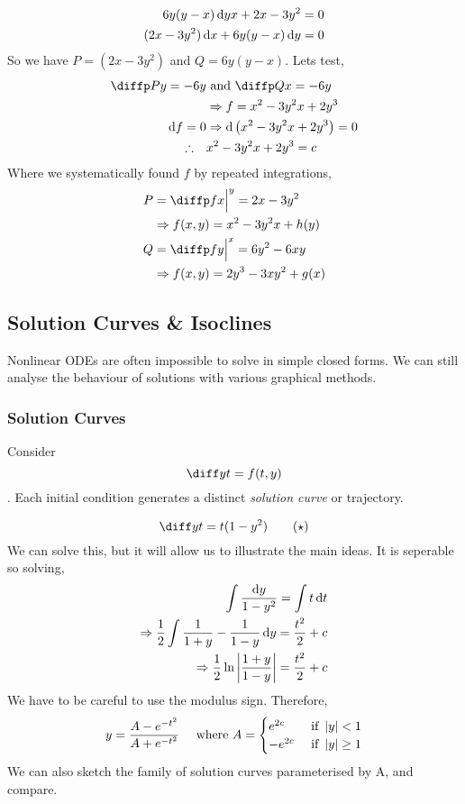 \documentclass{article}
\begin{document}
\begin{eg}
    \begin{align*}
        6y(y - x) \mathop{}\!\mathrm{d} yx + 2x - 3y^2 = 0 \\
        (2x - 3y^2) \mathop{}\!\mathrm{d} x + 6y(y-x) \mathop{}\!\mathrm{d} y = 0
    \end{align*}
    So we have $P = (2x - 3y^2)$ and $Q = 6y(y-x)$. Lets test,
    \begin{align*}
        \diffp Py = -6y &\text{ and } \diffp Qx = -6y \\
        &\Rightarrow f = x^2 - 3y^2x + 2y^3 \\
        \diffd f = 0 &\Rightarrow \diffd \bkt{x^2 - 3y^2x + 2y^3} = 0 \\
        \therefore \quad & x^2 - 3y^2x + 2y^3 = c
    \end{align*}
    Where we systematically found $f$ by repeated integrations,
    \begin{align*}
        P &= \diffp fx \eval^{y} = 2x - 3y^2 \\
        &\Rightarrow f(x, y) = x^2 - 3y^2x + h(y) \\
        Q &= \diffp fy \eval^{x} = 6y^2 - 6xy \\
        &\Rightarrow f(x, y) = 2y^3 - 3xy^2 + g(x)
    \end{align*}
\end{eg}

\subsection{Solution Curves \& Isoclines}
Nonlinear ODEs are often impossible to solve in simple closed forms. 
We can still analyse the behaviour of solutions with various graphical methods. 

\subsubsection{Solution Curves}
Consider 
\[
    \diff yt = f(t, y)
\]. 
Each initial condition generates a distinct \emph{solution curve} or trajectory.
\begin{eg}
    \[
        \diff yt = t(1 - y^2) \tag{$\star$}
    \]
    We can solve this, but it will allow us to illustrate the main ideas.
    It is seperable so solving,
    \begin{align*}
        \int{\frac{\mathop{}\!\mathrm{d}y}{1 - y^2}} = \int{t \mathop{}\!\mathrm{d}t} \\
        \Rightarrow \frac{1}{2} \int{\frac{1}{1+y} - \frac{1}{1-y} \mathop{}\!\mathrm{d}y} = \frac{t^2}{2} + c \\
        \Rightarrow \frac{1}{2} \ln \left\lvert \frac{1 + y}{1 - y}\right\rvert = \frac{t^2}{2} + c
    \end{align*}
    We have to be careful to use the modulus sign.
    Therefore,
    \[
        y = \frac{A - e^{-t^2}}{A + e^{-t^2}} \quad \text{ where } A = \begin{cases}
            e^{2c} & \text{ if } \left\lvert y\right\rvert < 1 \\
            -e^{2c} & \text{ if } \left\lvert y\right\rvert \geq 1
        \end{cases}
    \]
    We can also sketch the family of solution curves parameterised by A, and compare.
\end{eg}
\end{document}
